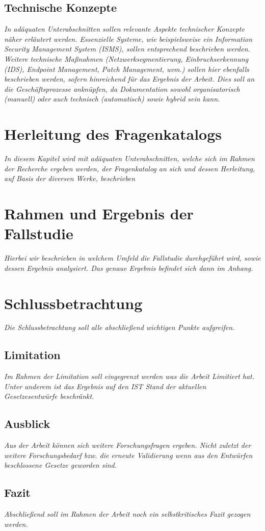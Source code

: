 \documentclass[11pt,a4paper]{article}   %
\begin{document}
        \subsection{Technische Konzepte}
            \emph{In adäquaten Unterabschnitten sollen relevante Aspekte technischer Konzepte näher erläutert werden. Essenzielle Systeme, wie beispielsweise ein Information Security Management System (ISMS), sollen entsprechend beschrieben werden. Weitere technische Maßnahmen (Netzwerksegmentierung, Einbruchserkennung (IDS), Endpoint Management, Patch Management, uvm.) sollen hier ebenfalls beschrieben werden, sofern hinreichend für das Ergebnis der Arbeit. Dies soll an die Geschäftsprozesse anknüpfen, da Dokumentation sowohl organisatorisch (manuell) oder auch technisch (automatisch) sowie hybrid sein kann.}

    \newpage
    \section{Herleitung des Fragenkatalogs}
        \emph{In diesem Kapitel wird mit adäquaten Unterabschnitten, welche sich im Rahmen der Recherche ergeben werden, der Fragenkatalog an sich und dessen Herleitung, auf Basis der diversen Werke, beschrieben}

    \newpage
    \section{Rahmen und Ergebnis der Fallstudie}
        \emph{Hierbei wir beschrieben in welchem Umfeld die Fallstudie durchgeführt wird, sowie dessen Ergebnis analysiert. Das genaue Ergebnis befindet sich dann im Anhang.}

    \newpage
    \section{Schlussbetrachtung}
        \emph{Die Schlussbetrachtung soll alle abschließend wichtigen Punkte aufgreifen.}
        \subsection{Limitation}
        \emph{Im Rahmen der Limitation soll eingegrenzt werden was die Arbeit Limitiert hat. Unter anderem ist das Ergebnis auf den IST Stand der aktuellen Gesetzesentwürfe beschränkt.}
        \subsection{Ausblick}
        \emph{Aus der Arbeit können sich weitere Forschungsfragen ergeben. Nicht zuletzt der weitere Forschungsbedarf bzw. die erneute Validierung wenn aus den Entwürfen beschlossene Gesetze geworden sind.}
        \subsection{Fazit}
        \emph{Abschließend soll im Rahmen der Arbeit noch ein selbstkritisches Fazit gezogen werden.}

    \newpage
    \printbibliography
\end{document}
